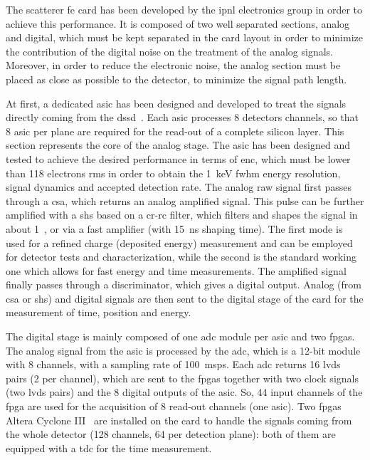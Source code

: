 The scatterer \gls{fe} card has been developed by the \gls{ipnl} electronics group in order to achieve this performance. It is composed of two well separated sections, analog and digital, which must be kept separated in the card layout in order to minimize the contribution of the digital noise on the treatment of the analog signals. Moreover, in order to reduce the electronic noise, the analog section must be placed as close as possible to the detector, to minimize the signal path length.

At first, a dedicated \gls{asic} has been designed and developed to treat the signals directly coming from the \gls{dssd}~\parencite{Dahoumane2014}. Each \gls{asic} processes 8 detectors channels, so that 8 \gls{asic} per plane are required for the read-out of a complete silicon layer. This section represents the core of the analog stage. The \gls{asic} has been designed and tested to achieve the desired performance in terms of \gls{enc}, which must be lower than 118 electrons \gls{rms} in order to obtain the 1~keV \gls{fwhm} energy resolution, signal dynamics and accepted detection rate. The analog raw signal first passes through a \gls{csa}, which returns an analog amplified signal. This pulse can be further amplified with a \gls{shs} based on a \gls{cr-rc} filter, which filters and shapes the signal in about 1~\charmus, or via a fast amplifier (with 15~ns shaping time). The first mode is used for a refined charge (deposited energy) measurement and can be employed for detector tests and characterization, while the second is the standard working one which allows for fast energy and time measurements. The amplified signal finally passes through a discriminator, which gives a digital output. Analog (from \gls{csa} or \gls{shs}) and digital signals are then sent to the digital stage of the card for the measurement of time, position and energy. 

The digital stage is mainly composed of one \gls{adc} module per \gls{asic} and two \glspl{fpga}. The analog signal from the \gls{asic} is processed by the \gls{adc}, which is a 12-bit module with 8 channels, with a sampling rate of 100~\gls{msps}. Each \gls{adc} returns 16 \gls{lvds} pairs (2 per channel), which are sent to the \glspl{fpga} together with two clock signals (two \gls{lvds} pairs) and the 8 digital outputs of the \gls{asic}. So, 44 input channels of the \gls{fpga} are used for the acquisition of 8 read-out channels (one \gls{asic}). Two \glspl{fpga} Altera Cyclone III~\parencite{Altera2012} are installed on the card to handle the signals coming from the whole detector (128 channels, 64 per detection plane): both of them are equipped with a \gls{tdc} for the time measurement.

